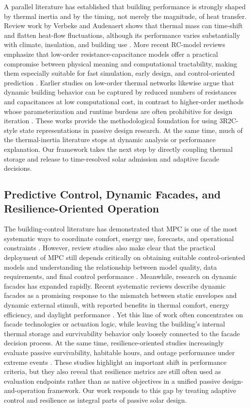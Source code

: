 \documentclass[preprint,12pt]{elsarticle}
\begin{document}
A parallel literature has established that building performance is strongly shaped by thermal inertia and by the timing, not merely the magnitude, of heat transfer. Review work by Verbeke and Audenaert shows that thermal mass can time-shift and flatten heat-flow fluctuations, although its performance varies substantially with climate, insulation, and building use \cite{verbeke2018}. More recent RC-model reviews emphasize that low-order resistance-capacitance models offer a practical compromise between physical meaning and computational tractability, making them especially suitable for fast simulation, early design, and control-oriented prediction \cite{yang2024}. Earlier studies on low-order thermal networks likewise argue that dynamic building behavior can be captured by reduced numbers of resistances and capacitances at low computational cost, in contrast to higher-order methods whose parameterization and runtime burdens are often prohibitive for design iteration \cite{lauster2014}. These works provide the methodological foundation for using 3R2C-style state representations in passive design research. At the same time, much of the thermal-inertia literature stops at dynamic analysis or performance explanation. Our framework takes the next step by directly coupling thermal storage and release to time-resolved solar admission and adaptive facade decisions.

\subsection{Predictive Control, Dynamic Facades, and Resilience-Oriented Operation}

The building-control literature has demonstrated that MPC is one of the most systematic ways to coordinate comfort, energy use, forecasts, and operational constraints \cite{drgona2020}. However, review studies also make clear that the practical deployment of MPC still depends critically on obtaining suitable control-oriented models and understanding the relationship between model quality, data requirements, and final control performance \cite{zhan2021}. Meanwhile, research on dynamic facades has expanded rapidly. Recent systematic reviews describe dynamic facades as a promising response to the mismatch between static envelopes and dynamic external stimuli, with reported benefits in thermal comfort, energy efficiency, and daylight performance \cite{goncalves2024}. Yet this line of work often concentrates on facade technologies or actuation logic, while leaving the building's internal thermal storage and survivability behavior only loosely connected to the facade decision process. At the same time, resilience-oriented studies increasingly evaluate passive survivability, habitable hours, and outage performance under extreme events \cite{hong2023,ismail2023}. These studies highlight an important shift in performance criteria, but they also reveal that resilience metrics are still often used as evaluation endpoints rather than as native objectives in a unified passive design-and-operation framework. Our work responds to this gap by treating adaptive control and resilience as integral parts of passive solar design.
\end{document}
